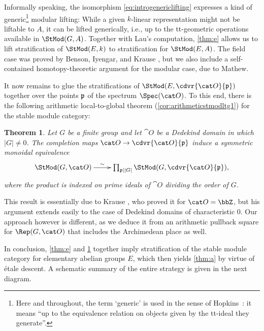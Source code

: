 \documentclass{amsart}%
\numberwithin{equation}{section}%
\newtheorem{thmx}{Theorem}
\theoremstyle{remark}
\begin{document}
Informally speaking, the isomorphism \eqref{eq:introgenericlifting} expresses a kind of generic\footnote{Here and throughout, the term `generic' is used in the sense of Hopkins~\cite{Hopkins87}: it means ``up to the equivalence relation on objects given by the tt-ideal they generate''.} modular lifting: While a given $k$-linear representation might not be liftable to $A$, it can be lifted generically, i.e., up to the tt-geometric operations available in $\StMod(G,A)$. Together with Lau's computation, \cref{thm:e} allows us to lift stratification of $\StMod(E,k)$ to stratification for $\StMod(E,A)$. The field case was proved by Benson, Iyengar, and Krause \cite{BensonIyengarKrause11a}, but we also include a self-contained homotopy-theoretic argument for the modular case, due to Mathew.  

It now remains to glue the stratifications of $\StMod(E,\cdvr{\cat O}{\frak p})$ together over the points $\frak p$ of the spectrum $\Spec(\cat O)$. To this end, there is the following arithmetic local-to-global theorem (\cref{cor:arithmeticstmodltg1}) for the stable module category:

\begin{thmx}\label{thm:f}
Let $G$ be a finite group and let $\cat O$ be a Dedekind domain in which $|G|\neq 0$. The completion maps $\cat O \to \cdvr{\cat O}{\frak p}$ induce a symmetric monoidal equivalence
\[
\xymatrix{\StMod(G,\cat O) \ar[r]^-{\sim} & \prod_{\frak p\mid |G|}\StMod(G, \cdvr{\cat O}{\frak p}),}
\]
where the product is indexed on prime ideals of $\cat O$ dividing the order of $G$.
\end{thmx}

This result is essentially due to Krause \cite{krause_picard}, who proved it for $\cat O = \bbZ$, but his argument extends easily to the case of Dedekind domains of characteristic $0$. Our approach however is different, as we deduce it from an arithmetic pullback square for $\Rep(G,\cat O)$ that includes the Archimedean place as well. 

In conclusion, \cref{thm:e} and \cref{thm:f} together imply stratification of the stable module category for elementary abelian groups $E$, which then yields \cref{thm:a} by virtue of \'etale descent. A schematic summary of the entire strategy is given in the next diagram.
\end{document}
